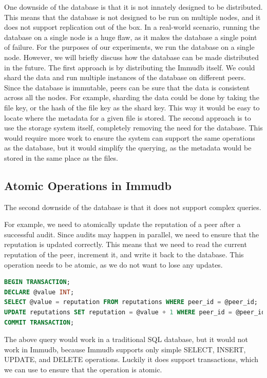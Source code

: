 One downside of the database is that it is not innately designed to be distributed.
This means that the database is not designed to be run on multiple nodes,
and it does not support replication out of the box.
In a real-world scenario, running the database on a single node is a huge flaw,
as it makes the database a single point of failure.
For the purposes of our experiments, we run the database on a single node.
However, we will briefly discuss how the database can be made distributed in the future.
The first approach is by distributing the Immudb itself.
We could shard the data and run multiple instances of the database on different peers.
Since the database is immutable, peers can be sure that the data is consistent across all the nodes.
For example, sharding the data could be done by taking the file key, or the hash of the file key as the shard key.
This way it would be easy to locate where the metadata for a given file is stored.
The second approach is to use the storage system itself, completely removing the need for the database.
This would require more work to ensure the system can support the same operations as the database,
but it would simplify the querying, as the metadata would be stored in the same place as the files.

\subsection{Atomic Operations in Immudb}
\label{section:atomic-operations}

The second downside of the database is that it does not support complex queries.

For example, we need to atomically update the reputation of a peer after a successful audit.
Since audits may happen in parallel, we need to ensure that the reputation is updated correctly.
This means that we need to read the current reputation of the peer, increment it, and write it back to the database.
This operation needs to be atomic, as we do not want to lose any updates.

\begin{lstlisting}[language=SQL, caption={SQL query to update the reputation of a peer}, label={lst:sql-query}]
BEGIN TRANSACTION;
DECLARE @value INT;
SELECT @value = reputation FROM reputations WHERE peer_id = @peer_id;
UPDATE reputations SET reputation = @value + 1 WHERE peer_id = @peer_id;
COMMIT TRANSACTION;
\end{lstlisting}

The above query would work in a traditional SQL database, but it would not work in Immudb,
because Immudb supports only simple SELECT, INSERT, UPDATE, and DELETE operations.
Luckily it does support transactions, which we can use to ensure that the operation is atomic.


